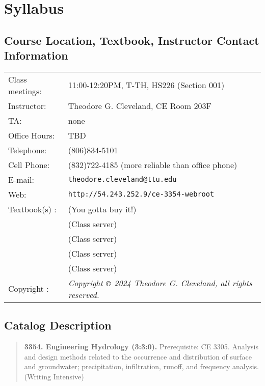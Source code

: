 \documentclass[12pt]{article}
\begin{document}
\section*{Syllabus}

\subsection*{{Course Location, Textbook, Instructor Contact Information}}
\begin{tabular}{p{1.5in}p{5.0in}}
Class meetings: &   11:00-12:20PM, T-TH, HS226 (Section 001) \\
Instructor: & Theodore G. Cleveland, CE Room 203F \\
TA: & none \\
Office Hours: & TBD \\%
Telephone: & (806)834-5101 \\
Cell Phone: & (832)722-4185 (more reliable than office phone) \\
E-mail: & \texttt{theodore.cleveland@ttu.edu}\\
Web: & \texttt{http://54.243.252.9/ce-3354-webroot}\\
Textbook(s) : & \cite{Gupta2017} (You gotta buy it!) \\
~ & \cite{CMM1988} (Class server) \\
~ & \cite{Dooge1973} (Class server) \\
~ & \cite{McCuen2002} (Class server) \\
~ & \cite{Cleveland2024} (Class server)\\
Copyright : & \textsl{Copyright $\copyright$ 2024 Theodore G. Cleveland, all rights reserved.} \\
\end{tabular}
\subsection*{{Catalog Description}}
\begin{quote} \textbf{3354. Engineering Hydrology (3:3:0).}  Prerequisite: CE 3305. Analysis and design methods related to the occurrence and distribution of surface and groundwater; precipitation, infiltration, runoff, and frequency analysis. (Writing Intensive)
\end{quote}
\end{document}
